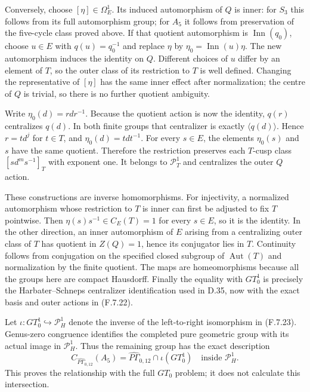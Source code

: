 Conversely, choose $[\eta]\in\Omega_E^1$.
Its induced automorphism of $Q$ is inner: for
$S_3$ this follows from its full automorphism group;
for $A_5$ it follows from preservation of the
five-cycle class proved above.
If that quotient automorphism is $\operatorname{Inn}(q_0)$,
choose $u\in E$ with $q(u)=q_0^{-1}$ and replace
$\eta$ by $\eta_0=\operatorname{Inn}(u)\eta$.
The new automorphism induces the identity on $Q$.
Different choices of $u$ differ by an element of $T$,
so the outer class of its restriction to $T$ is
well defined.  Changing the representative of
$[\eta]$ has the same inner effect after normalization;
the centre of $Q$ is trivial, so there is no further
quotient ambiguity.

Write $\eta_0(d)=rdr^{-1}$.  Because the quotient
action is now the identity, $q(r)$ centralizes
$q(d)$.  In both finite groups that centralizer is
exactly $\langle q(d)\rangle$.  Hence $r=t d^j$
for $t\in T$, and $\eta_0(d)=tdt^{-1}$.
For every $s\in E$, the elements $\eta_0(s)$ and
$s$ have the same quotient.  Therefore the restriction
preserves each $T$-cusp class
$[s d^m s^{-1}]_T$ with exponent one.
It belongs to $\mathcal P_T^1$ and centralizes the
outer $Q$ action.

These constructions are inverse homomorphisms.
For injectivity, a normalized automorphism whose
restriction to $T$ is inner can first be adjusted
to fix $T$ pointwise.  Then
$\eta(s)s^{-1}\in C_E(T)=1$ for every $s\in E$,
so it is the identity.  In the other direction,
an inner automorphism of $E$ arising from a
centralizing outer class of $T$ has quotient in
$Z(Q)=1$, hence its conjugator lies in $T$.
Continuity follows from conjugation on the specified
closed subgroup of $\operatorname{Aut}(T)$ and
normalization by the finite quotient.  The maps
are homeomorphisms because all the groups here
are compact Hausdorff.
Finally the equality with $GT_0^1$ is precisely the
Harbater--Schneps centralizer identification used
in D.35, now with the exact basis and outer actions
in (F.7.22)\cite[Propositions 3--4 and Theorem 2]{R-HS}.

Let $\iota:GT_0^1\hookrightarrow\mathcal P_H^1$
denote the inverse of the left-to-right isomorphism
in (F.7.23).  Genus-zero congruence identifies the
completed pure geometric group with its actual
image in $\mathcal P_H^1$.  Thus the remaining group
has the exact description
\[
             C_{\widehat{P\Gamma}_{0,12}}(A_5)
                 =\widehat{P\Gamma}_{0,12}
                                \cap\iota(GT_0^1)
                 \quad\text{inside }\mathcal P_H^1.     \tag{F.7.25}
\]
This proves the relationship with the full $GT_0$
problem; it does not calculate this intersection.

